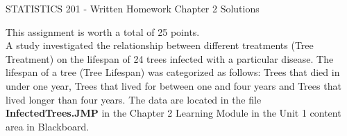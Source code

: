 \documentclass{article}
\begin{document}
\begin{center}
{\Large STATISTICS 201 - Written Homework Chapter 2 Solutions}\\[3mm]
\end{center}

\noindent
This assignment is worth a total of 25 points.\\

\noindent
A study investigated the relationship between different treatments (Tree Treatment) on the lifespan of 24 trees infected with a particular disease.  The lifespan of a tree (Tree Lifespan) was categorized as follows: Trees that died in under one year, Trees that lived for between one and four years and Trees that lived longer than four years.  The data are located in the file {\bf InfectedTrees.JMP} in the Chapter 2 Learning Module in the Unit 1 content area in Blackboard.
\end{document}
